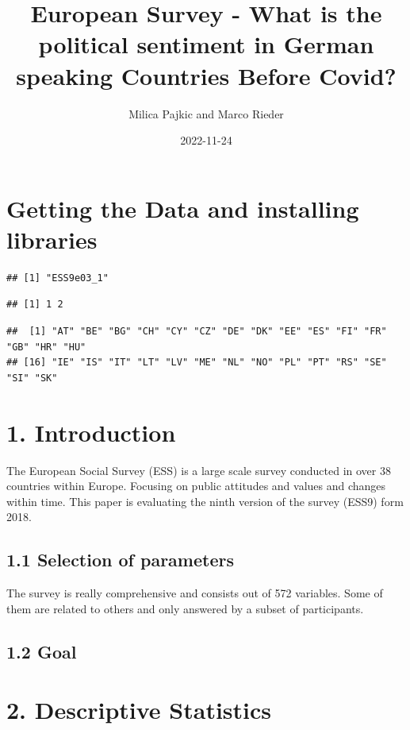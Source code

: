\documentclass[
]{article}
\title{European Survey - What is the political sentiment in German
speaking Countries Before Covid?}
\author{Milica Pajkic and Marco Rieder}
\date{2022-11-24}
\begin{document}
\maketitle

{
\setcounter{tocdepth}{5}
\tableofcontents
}
\hypertarget{getting-the-data-and-installing-libraries}{%
\section{Getting the Data and installing
libraries}\label{getting-the-data-and-installing-libraries}}

\begin{verbatim}
## [1] "ESS9e03_1"
\end{verbatim}

\begin{verbatim}
## [1] 1 2
\end{verbatim}

\begin{verbatim}
##  [1] "AT" "BE" "BG" "CH" "CY" "CZ" "DE" "DK" "EE" "ES" "FI" "FR" "GB" "HR" "HU"
## [16] "IE" "IS" "IT" "LT" "LV" "ME" "NL" "NO" "PL" "PT" "RS" "SE" "SI" "SK"
\end{verbatim}

\hypertarget{introduction}{%
\section{1. Introduction}\label{introduction}}

The European Social Survey (ESS) is a large scale survey conducted in
over 38 countries within Europe. Focusing on public attitudes and values
and changes within time. This paper is evaluating the ninth version of
the survey (ESS9) form 2018.

\hypertarget{selection-of-parameters}{%
\subsection{1.1 Selection of parameters}\label{selection-of-parameters}}

The survey is really comprehensive and consists out of 572 variables.
Some of them are related to others and only answered by a subset of
participants.

\hypertarget{goal}{%
\subsection{1.2 Goal}\label{goal}}

\hypertarget{descriptive-statistics}{%
\section{2. Descriptive Statistics}\label{descriptive-statistics}}
\end{document}
